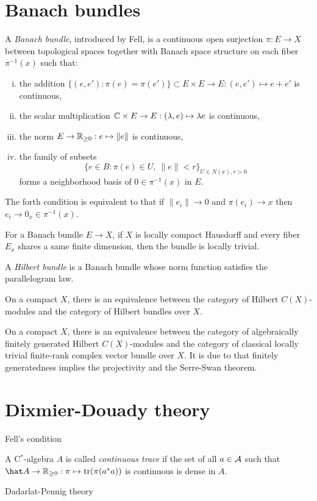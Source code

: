 \documentclass{../../large}
\begin{document}
\section{Banach bundles}

\begin{prb}
A \emph{Banach bundle}, introduced by Fell, is a continuous open surjection $\pi:E\to X$ between topological spaces together with Banach space structure on each fiber $\pi^{-1}(x)$ such that:
\begin{enumerate}[(i)]
\item the addition $\{(e,e'):\pi(e)=\pi(e')\}\subset E\times E\to E:(e,e')\mapsto e+e'$ is continuous,
\item the scalar multiplication $\mathbb{C}\times E\to E:(\lambda,e)\mapsto\lambda e$ is continuous,
\item the norm $E\to\mathbb{R}_{\ge0}:e\mapsto\|e\|$ is continuous,
\item the family of subsets
\[\{e\in B:\pi(e)\in U,\ \|e\|<r\}_{U\in N(x),r>0}\]
forms a neighborhood basis of $0\in\pi^{-1}(x)$ in $E$.
\end{enumerate}
The forth condition is equivalent to that if $\|e_i\|\to0$ and $\pi(e_i)\to x$ then $e_i\to 0_x\in\pi^{-1}(x)$.
\begin{parts}
\item For a Banach bundle $E\to X$, if $X$ is locally compact Hausdorff and every fiber $E_x$ shares a same finite dimension, then the bundle is locally trivial.
\end{parts}
\end{prb}


\begin{prb}
\end{prb}



\begin{prb}
A \emph{Hilbert bundle} is a Banach bundle whose norm function satisfies the parallelogram law.

\begin{parts}
\item On a compact $X$, there is an equivalence between the category of Hilbert $C(X)$-modules and the category of Hilbert bundles over $X$.
\item On a compact $X$, there is an equivalence between the category of algebraically finitely generated Hilbert $C(X)$-modules and the category of classical locally trivial finite-rank complex vector bundle over $X$.
It is due to that finitely generatedness implies the projectivity and the Serre-Swan theorem.
\end{parts}
\end{prb}

\section{Dixmier-Douady theory}


Fell's condition

A C$^*$-algebra $A$ is called \emph{continuous trace} if the set of all $a\in\mathcal{A}$ such that $\hat A\to\R_{\ge0}:\pi\mapsto\tr(\pi(a^*a))$ is continuous is dense in $A$.



Dadarlat-Pennig theory
\end{document}
